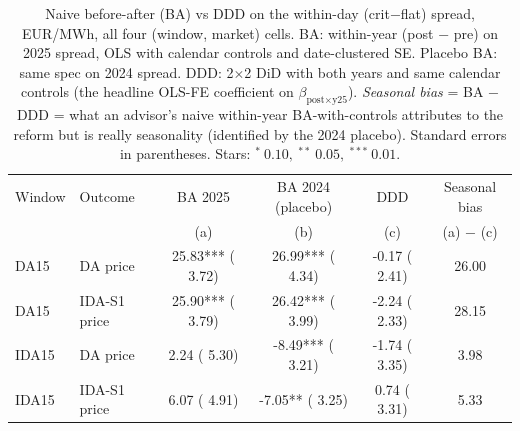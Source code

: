 \begin{table}[H]\centering\footnotesize
\setlength{\tabcolsep}{4pt}
\caption{Naive before-after (BA) vs DDD on the within-day (crit$-$flat) spread, EUR/MWh, all four (window, market) cells. BA: within-year (post $-$ pre) on 2025 spread, OLS with  calendar controls and date-clustered SE. Placebo BA: same spec on 2024 spread. DDD: 2$\times$2 DiD with both years and same calendar controls (the headline OLS-FE coefficient on $\beta_{\text{post}\times\text{y25}}$). \emph{Seasonal bias} = BA $-$ DDD = what an advisor's naive within-year BA-with-controls attributes to the reform but is really seasonality (identified by the 2024 placebo). Standard errors in parentheses. Stars: $^{*}~0.10,~^{**}~0.05,~^{***}~0.01$.}
\label{tab:ba_vs_ddd}
\begin{tabular}{llcccc}
\toprule
Window & Outcome & BA 2025 & BA 2024 (placebo) & DDD & Seasonal bias \\
       &         & (a)     & (b)               & (c) & (a) $-$ (c)   \\
\midrule
DA15 & DA price &   25.83*** \scriptsize{( 3.72)} &   26.99*** \scriptsize{( 4.34)} &   -0.17 \scriptsize{( 2.41)} &   26.00 \\
DA15 & IDA-S1 price &   25.90*** \scriptsize{( 3.79)} &   26.42*** \scriptsize{( 3.99)} &   -2.24 \scriptsize{( 2.33)} &   28.15 \\
IDA15 & DA price &    2.24 \scriptsize{( 5.30)} &   -8.49*** \scriptsize{( 3.21)} &   -1.74 \scriptsize{( 3.35)} &    3.98 \\
IDA15 & IDA-S1 price &    6.07 \scriptsize{( 4.91)} &   -7.05** \scriptsize{( 3.25)} &    0.74 \scriptsize{( 3.31)} &    5.33 \\
\bottomrule
\end{tabular}
\end{table}
